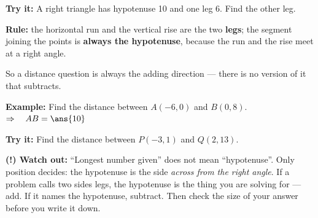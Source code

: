 \documentclass[12pt]{article}
\begin{document}
\begin{tryitbox}
\textbf{Try it:} \quad A right triangle has hypotenuse 10 and one leg 6. Find the other
leg.\\[2pt]
\end{tryitbox}


\begin{formulabox}
\textbf{Rule:} the horizontal run and the vertical rise are the two \textbf{legs}; the
segment joining the points is \textbf{always the hypotenuse}, because the run and the
rise meet at a right angle.\par
\smallskip
So a distance question is always the adding direction --- there is no version of it that
subtracts.
\end{formulabox}

\begin{examplebox}
\textbf{Example:} \quad Find the distance between $A(-6, 0)$ and $B(0, 8)$.
$\Rightarrow\quad AB = \ans{10}$
\end{examplebox}

\begin{tryitbox}
\textbf{Try it:} \quad Find the distance between $P(-3, 1)$ and $Q(2, 13)$.\\[2pt]
\end{tryitbox}

\begin{watchoutbox}
\textbf{(!) Watch out:} ``Longest number given'' does not mean ``hypotenuse''. Only
position decides: the hypotenuse is the side \emph{across from the right angle}. If a
problem calls two sides legs, the hypotenuse is the thing you are solving for --- add. If
it names the hypotenuse, subtract. Then check the size of your answer before you write it
down.
\end{watchoutbox}
\end{document}
